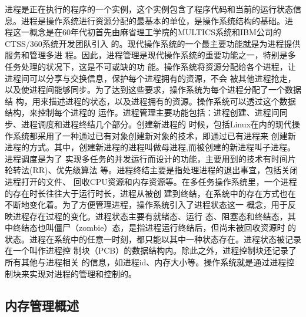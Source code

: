 \documentclass{swfuthesism}
\begin{document}
进程是正在执行的程序的一个实例，这个实例包含了程序代码和当前的运行状态信
息\cite{Sibasankar2010}。进程是操作系统进行资源分配的最基本的单位，是操作系统结构的基础。进
程这一概念是在60年代初首先由麻省理工学院的MULTICS系统和IBM公司的CTSS/360系统开发团队引入
的\cite{silberschatz11essentials}。现代操作系统的一个最主要功能就是为进程提供服务和管理多进
程。因此，进程管理是现代操作系统的重要功能之一，特别是多任务处理的状况下，这是不可或缺的功
能。操作系统将资源分配给各个进程，让进程间可以分享与交换信息，保护每个进程拥有的资源，不会
被其他进程抢走，以及使进程间能够同步。为了达到这些要求，操作系统为每个进程分配了一个数据结
构，用来描述进程的状态，以及进程拥有的资源。操作系统可以透过这个数据结构，来控制每个进程的
运作。进程管理主要功能包括：进程创建、进程间同步、进程调度和进程终结几个部分。创建新进程的
时候，包括Linux在内的现代操作系统都采用了一种通过已有对象创建新对象的技术，即通过已有进程来
创建新进程的方式。其中，创建新进程的进程叫做母进程,而被创建的新进程叫子进程。进程调度是为了
实现多任务的并发运行而设计的功能，主要用到的技术有时间片轮转法(RR)、优先级算法
等\cite{tanenbaum2008modern}。进程终结主要是指处理进程的退出事宜，包括关闭进程打开的文件、
回收CPU资源和内存资源等。在多任务操作系统里，一个进程的存在时长往往大于运行时长，进程从被创
建到终结，在系统中的存在方式也在不断地变化着。为了方便管理进程，操作系统引入了进程状态这一
概念，用于反映进程存在过程的变化\cite{silberschatz11essentials}。进程状态主要有就绪态、运行
态、阻塞态和终结态，其中终结态也叫僵尸（zombie）态，是指进程运行终结后，但尚未被回收资源时
的状态。进程在系统中的任意一时刻，都只能以其中一种状态存在。进程状态被记录在一个叫作进程控
制块（PCB）的数据结构内\cite{tigran2002lki}。除此之外，进程控制块还记录了所有其他与进程相关
的信息，如进程id、内存大小等。操作系统就是通过进程控制块来实现对进程的管理和控制的。

\subsection{内存管理概述}
\label{sec:mem}
\end{document}

